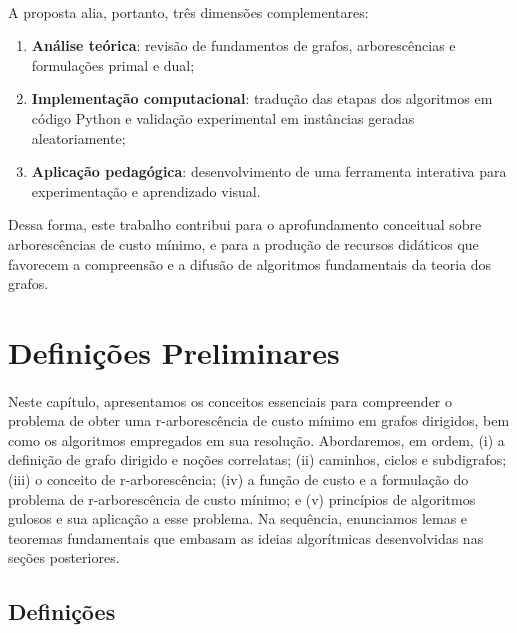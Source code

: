 \documentclass[12pt,a4paper]{article}
\begin{document}
\paragraph{}
A proposta alia, portanto, três dimensões complementares:  
\begin{enumerate}
    \item \textbf{Análise teórica}: revisão de fundamentos de grafos, arborescências e formulações primal e dual;
    \item \textbf{Implementação computacional}: tradução das etapas dos algoritmos em código Python e validação experimental em instâncias geradas aleatoriamente;
    \item \textbf{Aplicação pedagógica}: desenvolvimento de uma ferramenta interativa para experimentação e aprendizado visual.
\end{enumerate}

Dessa forma, este trabalho contribui para o aprofundamento conceitual sobre arborescências de custo mínimo, e para a produção de recursos didáticos que favorecem a compreensão e a difusão de algoritmos fundamentais da teoria dos grafos.

\section{Definições Preliminares}
\paragraph{}
Neste capítulo, apresentamos os conceitos essenciais para compreender o problema de obter uma r-arborescência de custo mínimo em grafos dirigidos, bem como os algoritmos empregados em sua resolução. Abordaremos, em ordem, (i) a definição de grafo dirigido e noções correlatas; (ii) caminhos, ciclos e subdigrafos; (iii) o conceito de r-arborescência; (iv) a função de custo e a formulação do problema de r-arborescência de custo mínimo; e (v) princípios de algoritmos gulosos e sua aplicação a esse problema. Na sequência, enunciamos lemas e teoremas fundamentais que embasam as ideias algorítmicas desenvolvidas nas seções posteriores.

\subsection{Definições}
\end{document}
